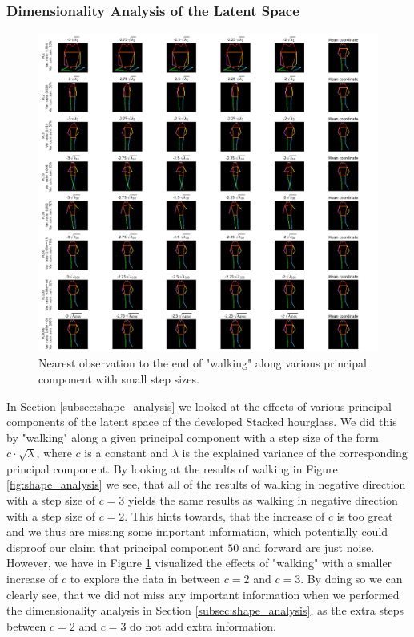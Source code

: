 \documentclass[./main.tex]{subfiles}
\begin{document}
\subsubsection{Dimensionality Analysis of the Latent Space}
\begin{figure}[htbp]
    \centering
    \includegraphics[width = \textwidth]{entities/shape_analysis_2.png}
    \caption{Nearest observation to the end of "walking" along various principal component with small step sizes.}
    \label{fig:shape_analysis_2}
\end{figure}
\noindent In Section \ref{subsec:shape_analysis} we looked at the effects of various principal components of the latent space of the developed Stacked hourglass. We did this by "walking" along a given principal component with a step size of the form $c \cdot \sqrt{\lambda}$, where $c$ is a constant and $\lambda$ is the explained variance of the corresponding principal component. By looking at the results of walking in Figure \ref{fig:shape_analysis} we see, that all of the results of walking in negative direction with a step size of $c = 3$ yields the same results as walking in negative direction with a step size of $c = 2$. This hints towards, that the increase of $c$ is too great and we thus are missing some important information, which potentially could disproof our claim that principal component $50$ and forward are just noise. However, we have in Figure \ref{fig:shape_analysis_2} visualized the effects of "walking" with a smaller increase of $c$ to explore the data in between $c = 2$ and $c = 3$. By doing so we can clearly see, that we did not miss any important information when we performed the dimensionality analysis in Section \ref{subsec:shape_analysis}, as the extra steps between $c = 2$ and $c = 3$ do not add extra information.
\end{document}
